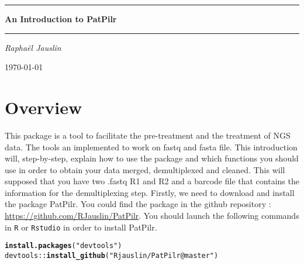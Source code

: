 \documentclass{article}\usepackage[]{graphicx}\usepackage[]{color}
\makeatletter
\newcommand{\hlstr}[1]{\textcolor[rgb]{0.192,0.494,0.8}{#1}}%
\newcommand{\hlopt}[1]{\textcolor[rgb]{0,0,0}{#1}}%
\newcommand{\hlstd}[1]{\textcolor[rgb]{0.345,0.345,0.345}{#1}}%
\newcommand{\hlkwd}[1]{\textcolor[rgb]{0.737,0.353,0.396}{\textbf{#1}}}%
\newenvironment{kframe}{%
 \def\at@end@of@kframe{}%
 \ifinner\ifhmode%
  \def\at@end@of@kframe{\end{minipage}}%
  \begin{minipage}{\columnwidth}%
 \fi\fi%
 \def\FrameCommand##1{\hskip\@totalleftmargin \hskip-\fboxsep
 \colorbox{shadecolor}{##1}\hskip-\fboxsep
     \hskip-\linewidth \hskip-\@totalleftmargin \hskip\columnwidth}%
 \MakeFramed {\advance\hsize-\width
   \@totalleftmargin\z@ \linewidth\hsize
   \@setminipage}}%
 {\par\unskip\endMakeFramed%
 \at@end@of@kframe}
\newenvironment{knitrout}{}{} %
\makeatother
\begin{document}

 \begin{titlepage}
 \hrule
 \vspace{0.5cm}
 {\huge\centering \bfseries An Introduction to PatPilr  \par}
 \vspace{0.5cm}
 \hrule
 \vspace{1.5cm}
 {\huge\bfseries \par}
 \vspace{2cm}
 {\Large\itshape Rapha\"el Jauslin\par}
 \vfill
 {\large \today\par}
 \end{titlepage}


\newpage

\tableofcontents
\newpage

\section{Overview}

This package is a tool to facilitate the pre-treatment and the treatment of NGS data. The tools an implemented to work on fastq and fasta file. This introduction will, step-by-step, explain how to use the package and which functions you should use in order to obtain your data merged, demultiplexed and cleaned. This will supposed that you have two .fastq R1 and R2 and a barcode file that contains the information for the demultiplexing step. Firstly, we need to download and install the package PatPilr. You could find the package in the github repository : \url{https://github.com/RJauslin/PatPilr}. You should launch the following commands in \texttt{R} or \texttt{Rstudio} in order to install PatPilr.

\begin{knitrout}
\color{fgcolor}\begin{kframe}
\begin{alltt}
\hlkwd{install.packages}\hlstd{(}\hlstr{"devtools"}\hlstd{)}
\hlstd{devtools}\hlopt{::}\hlkwd{install_github}\hlstd{(}\hlstr{"Rjauslin/PatPilr@master"}\hlstd{)}
\end{alltt}
\end{kframe}
\end{knitrout}
\end{document}
